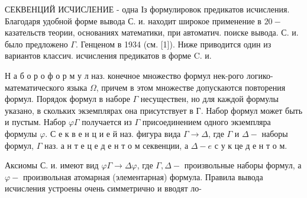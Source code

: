 \documentclass[10pt]{article}
\begin{document}
СЕКВЕНЦИЙ ИСЧИСЛЕНИЕ - одна Із формулировок предикатов исчисления. Благодаря удобной форме вывода С. и. находит широкое применение в $20-$ казательств теории, основаниях математики, при автоматич. поиске вывода. С. и. было предложено $\Gamma$. Генценом в 1934 (см. [1]). Ниже приводится один из вариантов классич. исчисления предикатов в форме C. и.



Н а б о р о ф о р м у л наз. конечное множество формул нек-рого логико-математического языка $\Omega$, причем в этом множестве допускаются повторения формул. Порядок формул в наборе $\Gamma$ несуществен, но для каждой формулы указано, в скольких экземплярах она присутствует в Г. Набор формул может быть и пустым. Набор $\varphi \Gamma$ получается из $\Gamma$ присоединением одного экземпляра формулы $\varphi$. С е к в е н ц и е й наз. фигура вида $\Gamma \rightarrow \Delta$, где $\Gamma$ и $\Delta-$ наборы формул, $\Gamma$ наз. а н т е ц е д е н т о м секвенции, а $\Delta-e$ с у к це д е н т о м.



Аксиомы С. и. имеют вид $\varphi \Gamma \rightarrow \Delta \varphi$, где $\Gamma, \Delta-$ произвольные наборы формул, а $\varphi-$ произвольная атомарная (элементарная) формула. Правила вывода исчисления устроены очень симметрично и вводят ло-
\end{document}
